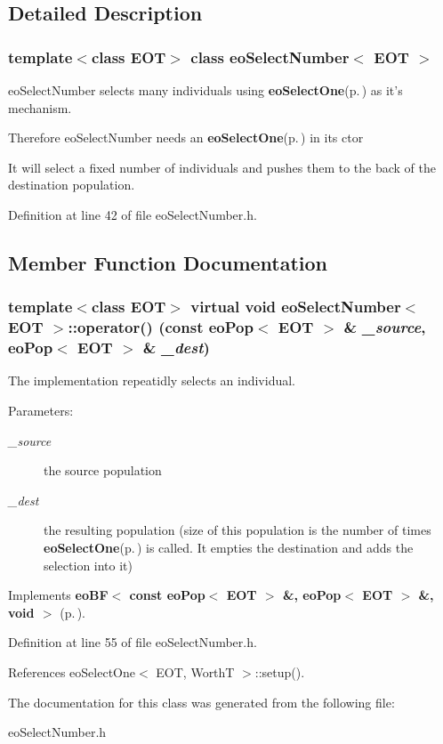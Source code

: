 \subsection{Detailed Description}
\subsubsection*{template$<$class EOT$>$ class eo\-Select\-Number$<$ EOT $>$}

eo\-Select\-Number selects many individuals using {\bf eo\-Select\-One}{\rm (p.\,\pageref{classeo_select_one})} as it's mechanism. 

Therefore eo\-Select\-Number needs an {\bf eo\-Select\-One}{\rm (p.\,\pageref{classeo_select_one})} in its ctor

It will select a fixed number of individuals and pushes them to the back of the destination population. 



Definition at line 42 of file eo\-Select\-Number.h.

\subsection{Member Function Documentation}
\subsubsection{\setlength{\rightskip}{0pt plus 5cm}template$<$class EOT$>$ virtual void {\bf eo\-Select\-Number}$<$ {\bf EOT} $>$::operator() (const {\bf eo\-Pop}$<$ {\bf EOT} $>$ \& {\em \_\-source}, {\bf eo\-Pop}$<$ {\bf EOT} $>$ \& {\em \_\-dest})\hspace{0.3cm}{\tt  [inline, virtual]}}\label{classeo_select_number_a1}


The implementation repeatidly selects an individual. 

\begin{Desc}
\item[Parameters:]
\begin{description}
\item[{\em \_\-source}]the source population \item[{\em \_\-dest}]the resulting population (size of this population is the number of times {\bf eo\-Select\-One}{\rm (p.\,\pageref{classeo_select_one})} is called. It empties the destination and adds the selection into it) \end{description}
\end{Desc}


Implements {\bf eo\-BF$<$ const eo\-Pop$<$ EOT $>$ \&, eo\-Pop$<$ EOT $>$ \&, void $>$} {\rm (p.\,\pageref{classeo_b_f_a1})}.

Definition at line 55 of file eo\-Select\-Number.h.

References eo\-Select\-One$<$ EOT, Worth\-T $>$::setup().

The documentation for this class was generated from the following file:\begin{CompactItemize}
\item 
eo\-Select\-Number.h\end{CompactItemize}
